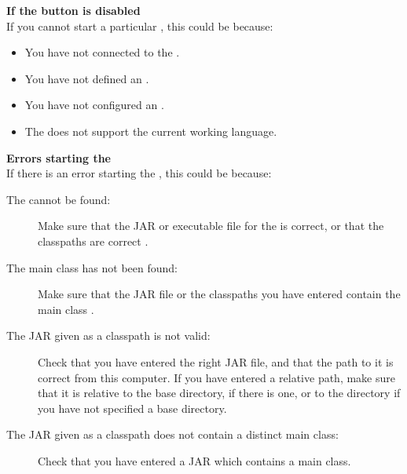 % 
%
%
\textbf{If the \gdaut{} button is disabled}\\
If you cannot start a particular \gdaut{}, this could be because:

\begin{itemize}
\item You have not connected to the \gdserver {}.
\item You have not defined an \gdaut{} .
\item You have not configured an \gdaut{} .
\item The \gdaut{} does not support the current working language. 
\end{itemize}

\textbf{Errors starting the \gdaut{}}\\
If there is an error starting the \gdaut{}, this could be because:
\begin{description}
\item [The \gdaut{} cannot be found:]{Make sure that the JAR or executable file for the \gdaut{} is correct, or that the classpaths are correct .}
\item [The main class has not been found:]{Make sure that the JAR file or the classpaths you have entered contain the main class . }
\item[The JAR given as a classpath is not valid:]{Check that you have entered the right JAR file, and that the path to it is correct from this computer. If you have entered a relative path, make sure that it is relative to the \gdaut{} base directory, if there is one, or to the \gdserver directory if you have not specified a \gdaut{} base directory. }
\item[The JAR given as a classpath does not contain a distinct  main 
class:]{Check that you have entered a JAR which contains a main class.}

\end{description}


